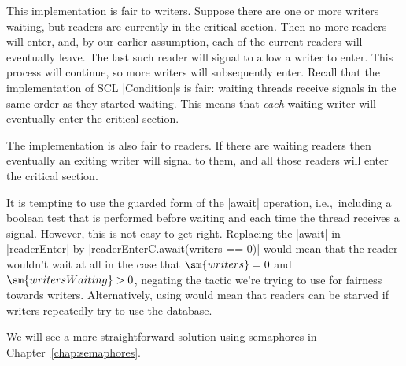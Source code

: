 This implementation is fair to writers.  Suppose there are one or more writers
waiting, but readers are currently in the critical section.  Then no more
readers will enter, and, by our earlier assumption, each of the current
readers will eventually leave.  The last such reader will signal to allow a
writer to enter.  This process will continue, so more writers will
subsequently enter.  Recall that the implementation of SCL |Condition|s is
fair: waiting threads receive signals in the same order as they started
waiting.  This means that \emph{each} waiting writer will eventually enter the
critical section.

The implementation is also fair to readers.  If there are waiting readers then
eventually an exiting writer will signal to them, and all those readers will
enter the critical section. 

It is tempting to use the guarded form of the |await| operation,
i.e.,~including a boolean test that is performed before waiting and each time
the thread receives a signal.  However, this is not easy to get right.
Replacing the |await| in |readerEnter| by |readerEnterC.await(writers == 0)|
would mean that the reader wouldn't wait at all in the case that $\sm{writers}
= 0$ and $\sm{writersWaiting} > 0$, negating the tactic we're trying to use for
fairness towards writers.  Alternatively, using
 would mean
that readers can be starved if writers repeatedly try to use the database.

We will see a more straightforward solution using semaphores in
Chapter~\ref{chap:semaphores}. 







